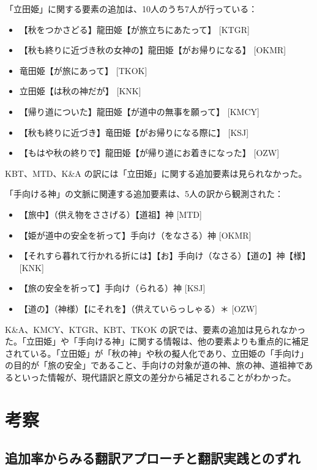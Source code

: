\documentclass[
  letterpaper,
  DIV=11,
  numbers=noendperiod]{scrartcl}
\providecommand{\tightlist}{%
  \setlength{\itemsep}{0pt}\setlength{\parskip}{0pt}}\usepackage{longtable,booktabs,array}
\begin{document}
「立田姫」に関する要素の追加は、10人のうち7人が行っている：

\begin{itemize}
\tightlist
\item
  【秋をつかさどる】龍田姫【が旅立ちにあたって】 {[}KTGR{]}
\item
  【秋も終りに近づき秋の女神の】龍田姫【がお帰りになる】 {[}OKMR{]}
\item
  竜田姫【が旅にあって】 {[}TKOK{]}
\item
  立田姫【は秋の神だが】 {[}KNK{]}
\item
  【帰り道についた】龍田姫【が道中の無事を願って】 {[}KMCY{]}
\item
  【秋も終りに近づき】竜田姫【がお帰りになる際に】 {[}KSJ{]}
\item
  【もはや秋の終りで】龍田姫【が帰り道にお着きになった】 {[}OZW{]}
\end{itemize}

KBT、MTD、K\&A の訳には「立田姫」に関する追加要素は見られなかった。

「手向ける神」の文脈に関連する追加要素は、5人の訳から観測された：

\begin{itemize}
\tightlist
\item
  【旅中】（供え物をささげる）【道祖】神 {[}MTD{]}
\item
  【姫が道中の安全を祈って】手向け（をなさる）神 {[}OKMR{]}
\item
  【それすら暮れて行かれる折には】【お】手向け（なさる）【道の】神【様】
  {[}KNK{]}
\item
  【旅の安全を祈って】手向け（られる）神 {[}KSJ{]}
\item
  【道の】（神様）【にそれを】（供えていらっしゃる）＊ {[}OZW{]}
\end{itemize}

K\&A、KMCY、KTGR、KBT、TKOK
の訳では、要素の追加は見られなかった。「立田姫」や「手向ける神」に関する情報は、他の要素よりも重点的に補足されている。「立田姫」が「秋の神」や秋の擬人化であり、立田姫の「手向け」の目的が「旅の安全」であること、手向けの対象が道の神、旅の神、道祖神であるといった情報が、現代語訳と原文の差分から補足されることがわかった。

\section{考察}\label{sec-discussion}

\subsection{追加率からみる翻訳アプローチと翻訳実践とのずれ}\label{ux8ffdux52a0ux7387ux304bux3089ux307fux308bux7ffbux8a33ux30a2ux30d7ux30edux30fcux30c1ux3068ux7ffbux8a33ux5b9fux8df5ux3068ux306eux305aux308c}
\end{document}
